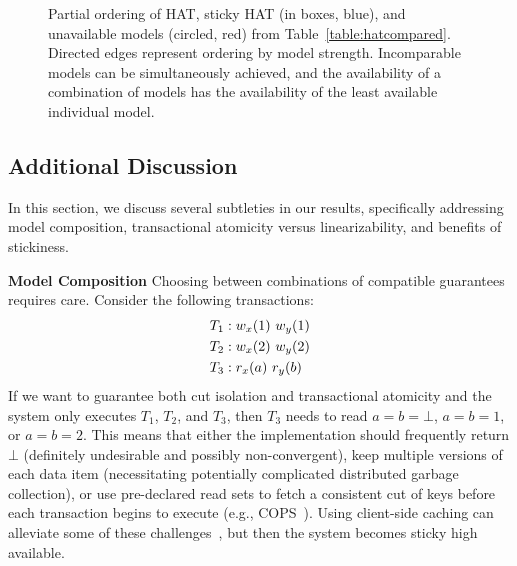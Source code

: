 \begin{figure}[t!]
\label{fig:hat-order}
\caption{Partial ordering of HAT, sticky HAT (in boxes, blue), and
  unavailable models (circled, red) from
  Table~\protect\ref{table:hatcompared}. Directed edges represent
  ordering by model strength. Incomparable models can be
  simultaneously achieved, and the availability of a combination of
  models has the availability of the least available individual
  model.}\vspace{-1em}
\label{fig:hatcompared}
\end{figure}


\subsection{Additional Discussion}
\label{sec:discussion}

In this section, we discuss several subtleties in our results,
specifically addressing model composition, transactional atomicity
versus linearizability, and benefits of stickiness.

\vspace{.5em}\noindent\textbf{Model Composition} Choosing between
combinations of compatible guarantees requires care. Consider the
following transactions:
\begin{align*}
\small\vspace{-1em}
T_1 &: w_x(1)~w_y(1)
\\T_2 &: w_x(2)~w_y(2)
\\T_3 &: r_x(a)~r_y(b)\vspace{-1em}
\end{align*}
If we want to guarantee both cut isolation and transactional atomicity
and the system only executes $T_1$, $T_2$, and $T_3$, then $T_3$ needs
to read $a=b=\bot$, $a=b=1$, or $a=b=2$. This means that either the
implementation should frequently return $\bot$ (definitely undesirable
and possibly non-convergent), keep multiple versions of each data item
(necessitating potentially complicated distributed garbage
collection), or use pre-declared read sets to fetch a consistent cut
of keys before each transaction begins to execute (e.g.,
COPS~\cite{cops}). Using client-side caching can alleviate some of
these challenges~\cite{bolton, swift}, but then the system becomes
sticky high available.

